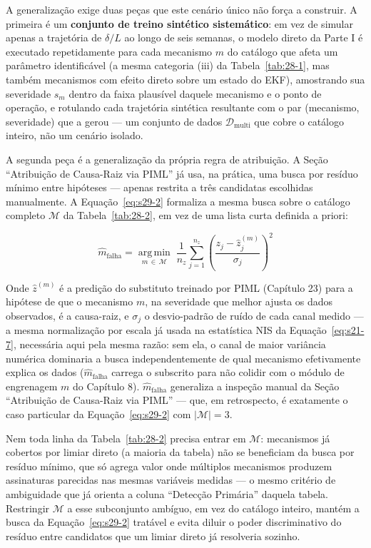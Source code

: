 \documentclass[12pt,a4paper]{article}
\numberwithin{equation}{section}
\numberwithin{table}{section}
\numberwithin{figure}{section}
\begin{document}
{A generalização exige duas peças que este cenário único não força a construir. A primeira é um \textbf{conjunto de treino sintético sistemático}: em vez de simular apenas a trajetória de $\delta/L$ ao longo de seis semanas, o modelo direto da Parte I é executado repetidamente para cada mecanismo $m$ do catálogo que afeta um parâmetro identificável (a mesma categoria (iii) da Tabela~\ref{tab:28-1}, mas também mecanismos com efeito direto sobre um estado do EKF), amostrando sua severidade $s_m$ dentro da faixa plausível daquele mecanismo e o ponto de operação, e rotulando cada trajetória sintética resultante com o par (mecanismo, severidade) que a gerou — um conjunto de dados $\mathcal{D}_{\text{multi}}$ que cobre o catálogo inteiro, não um cenário isolado.

A segunda peça é a generalização da própria regra de atribuição. A Seção ``Atribuição de Causa-Raiz via PIML'' já usa, na prática, uma busca por resíduo mínimo entre hipóteses — apenas restrita a três candidatas escolhidas manualmente. A Equação~\eqref{eq:s29-2} formaliza a mesma busca sobre o catálogo completo $\mathcal{M}$ da Tabela~\ref{tab:28-2}, em vez de uma lista curta definida a priori:

\begin{equation}\label{eq:s29-2}
\hat{m}_{\text{falha}} = \operatorname*{arg\,min}_{m \, \in \, \mathcal{M}} \; \frac{1}{n_z}\sum_{j=1}^{n_z} \left( \frac{z_j - \hat{z}_j^{(m)}}{\sigma_j} \right)^{2}
\end{equation}

Onde $\hat{z}^{(m)}$ é a predição do substituto treinado por PIML (Capítulo 23) para a hipótese de que o mecanismo $m$, na severidade que melhor ajusta os dados observados, é a causa-raiz, e $\sigma_j$ o desvio-padrão de ruído de cada canal medido — a mesma normalização por escala já usada na estatística NIS da Equação~\eqref{eq:s21-7}, necessária aqui pela mesma razão: sem ela, o canal de maior variância numérica dominaria a busca independentemente de qual mecanismo efetivamente explica os dados ($\hat{m}_{\text{falha}}$ carrega o subscrito para não colidir com o módulo de engrenagem $m$ do Capítulo 8). $\hat{m}_{\text{falha}}$ generaliza a inspeção manual da Seção ``Atribuição de Causa-Raiz via PIML'' — que, em retrospecto, é exatamente o caso particular da Equação~\eqref{eq:s29-2} com $|\mathcal{M}|=3$.

Nem toda linha da Tabela~\ref{tab:28-2} precisa entrar em $\mathcal{M}$: mecanismos já cobertos por limiar direto (a maioria da tabela) não se beneficiam da busca por resíduo mínimo, que só agrega valor onde múltiplos mecanismos produzem assinaturas parecidas nas mesmas variáveis medidas — o mesmo critério de ambiguidade que já orienta a coluna ``Detecção Primária'' daquela tabela. Restringir $\mathcal{M}$ a esse subconjunto ambíguo, em vez do catálogo inteiro, mantém a busca da Equação~\eqref{eq:s29-2} tratável e evita diluir o poder discriminativo do resíduo entre candidatos que um limiar direto já resolveria sozinho.

}
\end{document}
